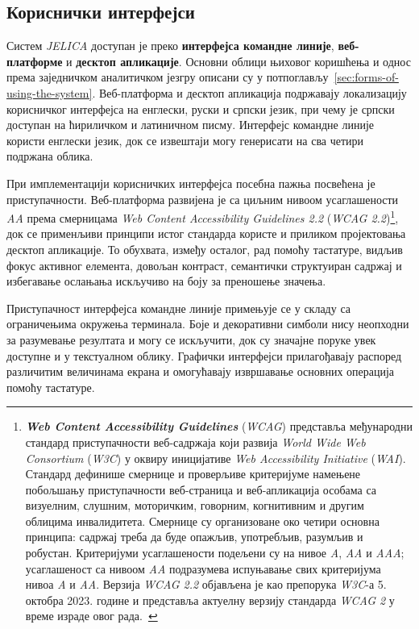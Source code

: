 \documentclass[12pt,oneside]{memoir}
\begin{document}
\subsection{Кориснички интерфејси}
Систем \textit{JELICA} доступан је преко \textbf{интерфејса командне линије}, \textbf{веб-платформе} и \textbf{десктоп апликације}. Основни облици њиховог коришћења и однос према заједничком аналитичком језгру описани су у потпоглављу~\ref{sec:forms-of-using-the-system}. Веб-платформа и десктоп апликација подржавају локализацију корисничког интерфејса на енглески, руски и српски језик, при чему је српски доступан на ћириличком и латиничном писму. Интерфејс командне линије користи енглески језик, док се извештаји могу генерисати на сва четири подржана облика.

При имплементацији корисничких интерфејса посебна пажња посвећена је приступачности. Веб-платформа развијена је са циљним нивоом усаглашености \textit{AA} према смерницама \textit{Web Content Accessibility Guidelines 2.2} (\textit{WCAG 2.2})\footnote{\textit{\textbf{Web Content Accessibility Guidelines}} (\textit{WCAG}) представља међународни стандард приступачности веб-садржаја који развија \textit{World Wide Web Consortium} (\textit{W3C}) у оквиру иницијативе \textit{Web Accessibility Initiative} (\textit{WAI}). Стандард дефинише смернице и проверљиве критеријуме намењене побољшању приступачности веб-страница и веб-апликација особама са визуелним, слушним, моторичким, говорним, когнитивним и другим облицима инвалидитета. Смернице су организоване око четири основна принципа: садржај треба да буде опажљив, употребљив, разумљив и робустан. Критеријуми усаглашености подељени су на нивое \textit{A}, \textit{AA} и \textit{AAA}; усаглашеност са нивоом \textit{AA} подразумева испуњавање свих критеријума нивоа \textit{A} и \textit{AA}. Верзија \textit{WCAG 2.2} објављена је као препорука \textit{W3C}-а 5. октобра 2023. године и представља актуелну верзију стандарда \textit{WCAG 2} у време израде овог рада.~\cite{wcag22}}, док се применљиви принципи истог стандарда користе и приликом пројектовања десктоп апликације. То обухвата, између осталог, рад помоћу тастатуре, видљив фокус активног елемента, довољан контраст, семантички структуиран садржај и избегавање ослањања искључиво на боју за преношење значења.

Приступачност интерфејса командне линије примењује се у складу са ограничењима окружења терминала. Боје и декоративни симболи нису неопходни за разумевање резултата и могу се искључити, док су значајне поруке увек доступне и у текстуалном облику. Графички интерфејси прилагођавају распоред различитим величинама екрана и омогућавају извршавање основних операција помоћу тастатуре.
\end{document}
